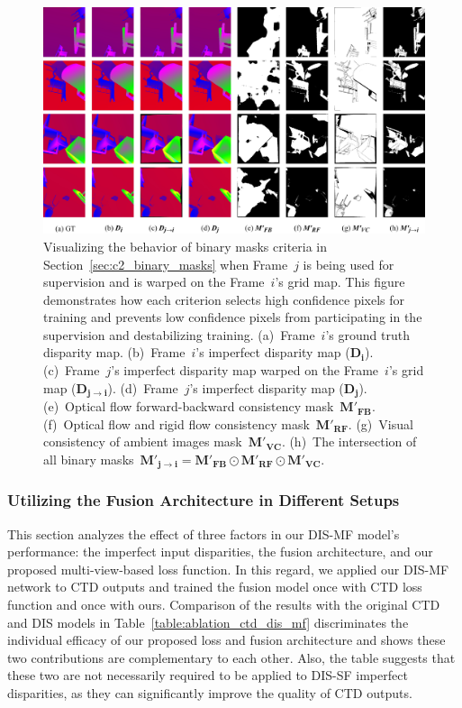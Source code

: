 \begin{figure}[t]
    \begin{center}
        \includegraphics[width=1.0\linewidth]{images/chapter2/supp_figures/visualize_masks.jpg}
    \end{center}
   \caption{Visualizing the behavior of binary masks criteria in Section~\ref{sec:c2_binary_masks} when Frame~$j$ is being used for supervision and is warped on the Frame~$i$'s grid map. This figure demonstrates how each criterion selects high confidence pixels for training and prevents low confidence pixels from participating in the supervision and destabilizing training. (a)~Frame~$i$'s ground truth disparity map. (b)~Frame~$i$'s imperfect disparity map ($\boldsymbol{D_{i}}$). (c)~Frame~$j$'s imperfect disparity map warped on the Frame~$i$'s grid map ($\boldsymbol{D_{j \rightarrow i}}$). (d)~Frame~$j$'s imperfect disparity map ($\boldsymbol{D_{j}}$). (e)~Optical flow forward-backward consistency mask~$\boldsymbol{M'_{FB}}$. (f)~Optical flow and rigid flow consistency mask~$\boldsymbol{M'_{RF}}$. (g)~Visual consistency of ambient images mask~$\boldsymbol{M'_{VC}}$. (h)~The intersection of all binary masks~$\boldsymbol{M'_{j \rightarrow i}} = \boldsymbol{M'_{FB}} \odot \boldsymbol{M'_{RF}} \odot \boldsymbol{M'_{VC}}$.}
    \label{fig:c2_visualize_masks}
\end{figure}

\subsubsection{Utilizing the Fusion Architecture in Different Setups}
This section analyzes the effect of three factors in our DIS-MF model's performance: the imperfect input disparities, the fusion architecture, and our proposed multi-view-based loss function. In this regard, we applied our DIS-MF network to CTD outputs and trained the fusion model once with CTD loss function and once with ours. Comparison of the results with the original CTD and DIS models in Table~\ref{table:ablation_ctd_dis_mf} discriminates the individual efficacy of our proposed loss and fusion architecture and shows these two contributions are complementary to each other. Also, the table suggests that these two are not necessarily required to be applied to DIS-SF imperfect disparities, as they can significantly improve the quality of CTD outputs.

